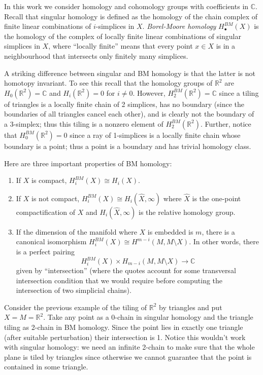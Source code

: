 In this work we consider homology and cohomology
groups with coefficients in $\mathbb{C}$.
Recall that singular homology is defined
as the homology of the chain complex of
finite linear combinations of $i$-simplices in $X$.
\textit{Borel-Moore homology} $H_\bullet^{BM}(X)$ 
is the homology of the complex of locally finite
linear combinations of singular simplices in $X$,
where ``locally finite'' means that every
point $x \in X$ is in a neighbourhood
that intersects only finitely many 
simplices.

A striking 
difference between singular and BM homology
is that the latter is not homotopy invariant.
To see this recall that the homology groups
of  $\mathbb{R}^2$ are $H_0(\mathbb{R}^2)=\mathbb{C}$
and $H_i(\mathbb{R}^2)=0$ for $i \neq 0$.
However, $H_2^{BM}(\mathbb{R}^2)=\mathbb{C}$ 
since a tiling of triangles
is a locally finite chain of 2 simplices,
has no boundary (since the boundaries of
all triangles cancel each other),
and is clearly not the boundary of a 3-simplex;
thus this tiling is a nonzero element of $H_2^{BM}(\mathbb{R}^2)$.
Further, notice that $H_0^{BM}(\mathbb{R}^2)=0$
since a ray of 1-simplices
is a locally finite chain
whose boundary is a point;
thus a point is a boundary and 
has trivial homology class.

\medskip\noindent
Here are three important properties of BM homology:
\begin{enumerate}
\item If $X$ is compact, $H_i^{BM}(X)\cong H_i(X)$.
\item If $X$ is not compact,
$H_i^{BM}(X)\cong H_i(\hat{X},\infty)$ 
where $\hat{X}$ is the one-point
compactification of $X$ and
$H_i(\hat{X},\infty)$ is the
relative homology group.
\item 
\label{item-isomorphism-relative-cohomology}
If the dimension of the manifold
where $X$ is embedded is $m$,
there is a canonical isomorphism
$H_i^{BM}(X) \cong H^{m-i}(M,M\setminus X)$.
In other words, there is a perfect
pairing
$$
H_i^{BM}(X) \times H_{m-i}(M,M\setminus X)\to \mathbb{C}
$$
given by ``intersection''
(where the quotes account for some
transversal intersection condition
that we would require before
computing the intersection of
two simplicial chains).
\end{enumerate}

Consider the previous example of
the tiling of $\mathbb{R}^2$
by triangles and put 
$X=M=\mathbb{R}^2$.
Take any point as a 0-chain in singular homology
and the triangle tiling as 2-chain in BM homology.
Since the point lies in exactly one triangle
(after suitable perturbation)
their intersection is 1.
Notice this wouldn't work with
singular homology: we need an infinite 2-chain
to make sure that the whole plane
is tiled by triangles since
otherwise we cannot guarantee that the point
is contained in some triangle.

